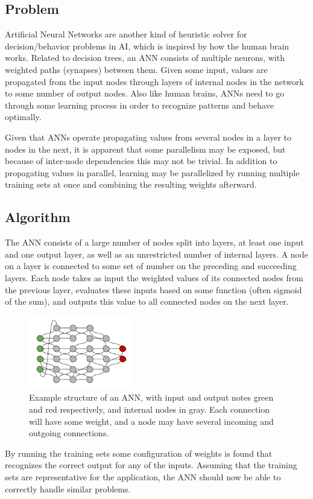 \documentclass[twocolumn]{article} %
\begin{document}
	\subsection*{Problem}
		Artificial Neural Networks are another kind of heuristic solver for decision/behavior problems in AI, which is
		inspired by how the human brain works. Related to decision	trees, an ANN consists of multiple neurons, with weighted
		paths (synapses) between them. Given some input, values are propagated from the input nodes through layers of internal
		nodes in the network to some number of output nodes. Also like human brains, ANNs need to go through some learning
		process in order to recognize patterns and behave optimally.
		
		Given that ANNs operate propagating values from several nodes in a layer to nodes in the next, it is apparent that some
		parallelism may be exposed, but because of inter-node dependencies this may not be trivial. In addition to
		propagating values in parallel, learning may be parallelized by running multiple training sets at once and combining
		the resulting weights afterward.
	
	\subsection*{Algorithm}
		The ANN consists of a large number of nodes split into layers, at least one input and one output layer, as well as an
		unrestricted number of internal layers. A node on a layer is connected to some set of number on the preceding and
		succeeding layers. Each node takes as input the weighted values of its connected nodes from the previous layer,
		evaluates these inputs based on some function (often sigmoid of the sum), and outputs this value to all connected nodes
		on the next layer.
		\begin{figure}[h]
			\centering
			\includegraphics[width=0.4\textwidth]{ann}
			\caption{Example structure of an ANN, with input and output notes green and red respectively, and internal nodes in
			gray. Each connection will have some weight, and a node may have several incoming and outgoing connections.}
			\label{fig:ann}
		\end{figure}
		By running the training sets some configuration of weights is found that recognizes the correct
		output for any of the inputs. Assuming that the training sets are representative for the application, the ANN should
		now be able to correctly handle similar problems.
		
\end{document}
